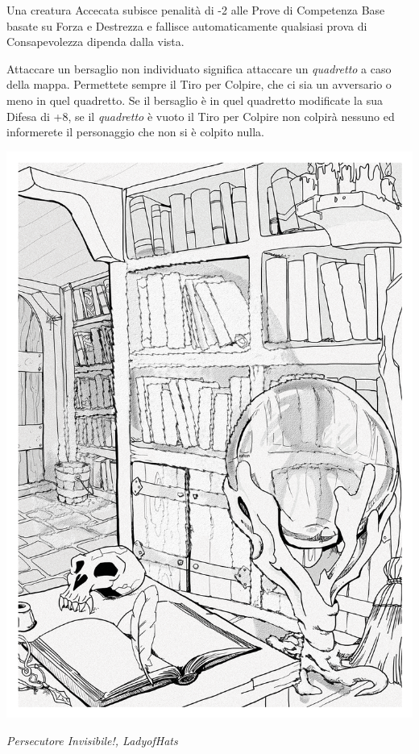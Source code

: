 \begin{multicols}{2}
Una creatura Accecata subisce penalità di -2 alle Prove di Competenza Base basate su Forza e Destrezza e fallisce automaticamente qualsiasi prova di Consapevolezza dipenda dalla vista.

Attaccare un bersaglio non individuato significa attaccare un \emph{quadretto} a caso della mappa. Permettete sempre il Tiro per Colpire, che ci sia un avversario o meno in quel quadretto. Se il bersaglio è in quel quadretto modificate la sua Difesa di +8, se il \emph{quadretto} è vuoto il Tiro per Colpire non colpirà nessuno ed informerete il personaggio che non si è colpito nulla.

\medskip
\begin{center}

	\includegraphics[width=0.8\linewidth]{immagini/DnD_Invisible_stalker.png}

	\emph{Persecutore Invisibile!, LadyofHats}

\end{center}

\medskip

%


\end{multicols}
